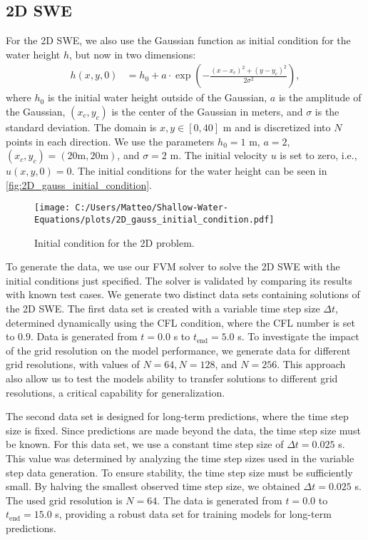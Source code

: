 \subsection*{2D SWE}
For the 2D SWE, we also use the Gaussian function as initial condition for the water height $h$, but now in two dimensions:
\begin{align}\label{eq:2D_swe_ic_gaussian}
    h(x,y,0) &= h_0 + a \cdot \exp \left( -\frac{{(x-x_c)}^2 + {(y-y_c)}^2}{2\sigma^2} \right), 
\end{align}
where $h_0$ is the initial water height outside of the Gaussian, $a$ is the amplitude of the Gaussian, $(x_c, y_c)$ is the center of the Gaussian in meters, and $\sigma$ is the standard deviation.
The domain is $x,y \in [0,40]$ m and is discretized into $N$ points in each direction.
We use the parameters $h_0 = 1$ m, $a = 2$, $(x_c, y_c) = (20 \text{m}, 20 \text{m})$, and $\sigma = 2$ m.
The initial velocity $u$ is set to zero, i.e., $u(x,y,0) = 0$.
The initial conditions for the water height can be seen in \autoref{fig:2D_gauss_initial_condition}.
\begin{figure}[H]
    \centering
    \texttt{[image: C:/Users/Matteo/Shallow-Water-Equations/plots/2D\_gauss\_initial\_condition.pdf]}
    \caption{Initial condition for the 2D problem.}\label{fig:2D_gauss_initial_condition_data_gen}
\end{figure}
To generate the data, we use our FVM solver to solve the 2D SWE with the initial conditions just specified.
The solver is validated by comparing its results with known test cases.
We generate two distinct data sets containing solutions of the 2D SWE.
The first data set is created with a variable time step size $\Delta t$, determined dynamically using the CFL condition, where the CFL number is set to $0.9$.
Data is generated from $t = 0.0$ s to $t_{\text{end}} = 5.0$ s.
To investigate the impact of the grid resolution on the model performance, we generate data for different grid resolutions, with values of $N = 64, N = 128$, and $N = 256$.
This approach also allow us to test the models ability to transfer solutions to different grid resolutions, a critical capability for generalization.

The second data set is designed for long-term predictions, where the time step size is fixed.
Since predictions are made beyond the data, the time step size must be known.
For this data set, we use a constant time step size of $\Delta t = 0.025$ s.
This value was determined by analyzing the time step sizes used in the variable step data generation.
To ensure stability, the time step size must be sufficiently small.
By halving the smallest observed time step size, we obtained $\Delta t = 0.025$ s.
The used grid resolution is $N = 64$.
The data is generated from $t = 0.0$ to $t_{\text{end}} = 15.0$ s, providing a robust data set for training models for long-term predictions.

